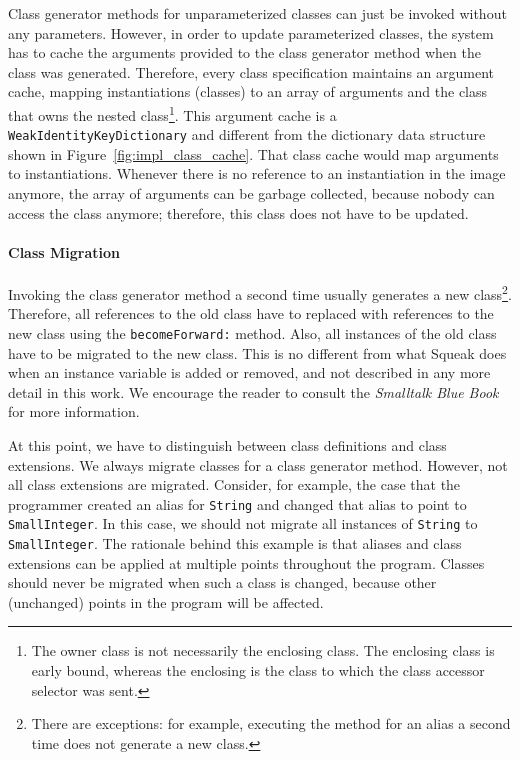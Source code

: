 Class generator methods for unparameterized classes can just be invoked without any parameters. However, in order to update parameterized classes, the system has to cache the arguments provided to the class generator method when the class was generated. Therefore, every class specification maintains an argument cache, mapping instantiations (classes) to an array of arguments and the class that owns the nested class\footnote{The owner class is not necessarily the enclosing class. The enclosing class is early bound, whereas the enclosing is the class to which the class accessor selector was sent.}. This argument cache is a \texttt{WeakIdentityKeyDictionary} and different from the dictionary data structure shown in Figure~\ref{fig:impl_class_cache}. That class cache would map arguments to instantiations. Whenever there is no reference to an instantiation in the image anymore, the array of arguments can be garbage collected, because nobody can access the class anymore; therefore, this class does not have to be updated.

\paragraph{Class Migration}
Invoking the class generator method a second time usually generates a new class\footnote{There are exceptions: for example, executing the method for an alias a second time does not generate a new class.}. Therefore, all references to the old class have to replaced with references to the new class using the \texttt{becomeForward:} method. Also, all instances of the old class have to be migrated to the new class. This is no different from what Squeak does when an instance variable is added or removed, and not described in any more detail in this work. We encourage the reader to consult the \emph{Smalltalk Blue Book}~\cite{Goldberg:1983:SLI:273} for more information.

At this point, we have to distinguish between class definitions and class extensions. We always migrate classes for a class generator method. However, not all class extensions are migrated. Consider, for example, the case that the programmer created an alias for \texttt{String} and changed that alias to point to \texttt{SmallInteger}. In this case, we should not migrate all instances of \texttt{String} to \texttt{SmallInteger}. The rationale behind this example is that aliases and class extensions can be applied at multiple points throughout the program. Classes should never be migrated when such a class is changed, because other (unchanged) points in the program will be affected. 

